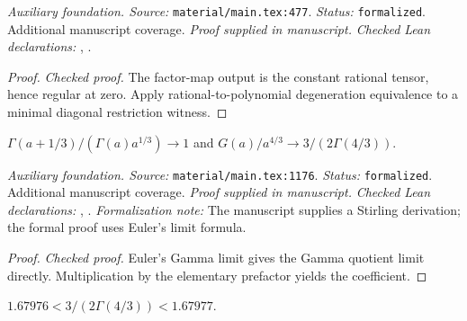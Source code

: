 \noindent\textit{Auxiliary foundation. Source:} \texttt{material/main.tex:477}.
\textit{Status:} \texttt{formalized}. Additional manuscript coverage.
\textit{Proof supplied in manuscript.}
\textit{Checked Lean declarations:} , .

\begin{proof}
\leanok
{}
\textit{Checked proof.} The factor-map output is the constant rational tensor, hence regular at zero. Apply rational-to-polynomial degeneration equivalence to a minimal diagonal restriction witness.
\end{proof}

\renewcommand{\thetheorem}{A82}
\begin{lemma}
\label{aux:gamma-asymptotic}
\manuscriptproof
{}
\leanok
$\Gamma(a+1/3)/(\Gamma(a)a^{1/3})\to1$ and $G(a)/a^{4/3}\to3/(2\Gamma(4/3))$.
\end{lemma}

\noindent\textit{Auxiliary foundation. Source:} \texttt{material/main.tex:1176}.
\textit{Status:} \texttt{formalized}. Additional manuscript coverage.
\textit{Proof supplied in manuscript.}
\textit{Checked Lean declarations:} , .
\textit{Formalization note:} The manuscript supplies a Stirling derivation; the formal proof uses Euler’s limit formula.

\begin{proof}
\leanok
{}
\textit{Checked proof.} Euler’s Gamma limit gives the Gamma quotient limit directly. Multiplication by the elementary prefactor yields the coefficient.
\end{proof}

\renewcommand{\thetheorem}{A83}
\begin{lemma}
\label{aux:gamma-coefficient-enclosure}
\leanok
$1.67976<3/(2\Gamma(4/3))<1.67977$.
\end{lemma}

